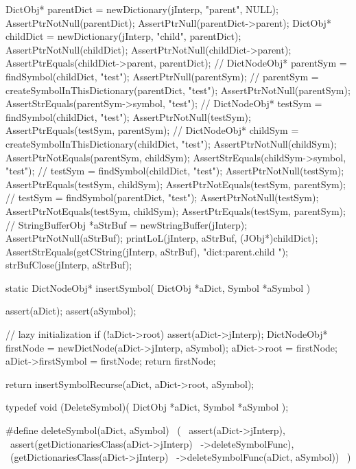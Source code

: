   DictObj* parentDict = newDictionary(jInterp, "parent", NULL);
  AssertPtrNotNull(parentDict);
  AssertPtrNull(parentDict->parent);
  DictObj* childDict  = newDictionary(jInterp, "child", parentDict);
  AssertPtrNotNull(childDict);
  AssertPtrNotNull(childDict->parent);
  AssertPtrEquals(childDict->parent, parentDict);
  //
  DictNodeObj* parentSym = findSymbol(childDict, "test");
  AssertPtrNull(parentSym);
  //
  parentSym = 
    createSymbolInThisDictionary(parentDict, "test");
  AssertPtrNotNull(parentSym);
  AssertStrEquals(parentSym->symbol, "test");
  //
  DictNodeObj* testSym = findSymbol(childDict, "test");
  AssertPtrNotNull(testSym);
  AssertPtrEquals(testSym, parentSym);
  //
  DictNodeObj* childSym =
    createSymbolInThisDictionary(childDict, "test");
  AssertPtrNotNull(childSym);
  AssertPtrNotEquals(parentSym, childSym);
  AssertStrEquals(childSym->symbol, "test");
  //
  testSym = findSymbol(childDict, "test");
  AssertPtrNotNull(testSym);
  AssertPtrEquals(testSym, childSym);
  AssertPtrNotEquals(testSym, parentSym);
  //
  testSym = findSymbol(parentDict, "test");
  AssertPtrNotNull(testSym);
  AssertPtrNotEquals(testSym, childSym);
  AssertPtrEquals(testSym, parentSym);
  //
  StringBufferObj *aStrBuf = newStringBuffer(jInterp);
  AssertPtrNotNull(aStrBuf);
  printLoL(jInterp, aStrBuf, (JObj*)childDict);
  AssertStrEquals(getCString(jInterp, aStrBuf), "dict:parent.child ");
  strBufClose(jInterp, aStrBuf);  
\stopCTest
\stopTestCase
\stopTestSuite

\startTestSuite[insertSymbol]

\startCCode
static DictNodeObj* insertSymbol(
  DictObj *aDict,
  Symbol  *aSymbol
) {
  assert(aDict);
  assert(aSymbol);

  // lazy initialization
  if (!aDict->root) {
    assert(aDict->jInterp);
    DictNodeObj* firstNode = newDictNode(aDict->jInterp, aSymbol);
    aDict->root            = firstNode;
    aDict->firstSymbol     = firstNode;
    return firstNode;
  }

  return insertSymbolRecurse(aDict, aDict->root, aSymbol);
}
\stopCCode
\stopTestSuite

\startTestSuite[deleteSymbol]

\startCHeader
typedef void (DeleteSymbol)(
  DictObj *aDict,
  Symbol  *aSymbol
);

#define deleteSymbol(aDict, aSymbol)            \
  (                                             \
    assert(aDict->jInterp),                     \
    assert(getDictionariesClass(aDict->jInterp) \
      ->deleteSymbolFunc),                      \
    (getDictionariesClass(aDict->jInterp)       \
      ->deleteSymbolFunc(aDict, aSymbol))       \
  )
\stopCHeader

